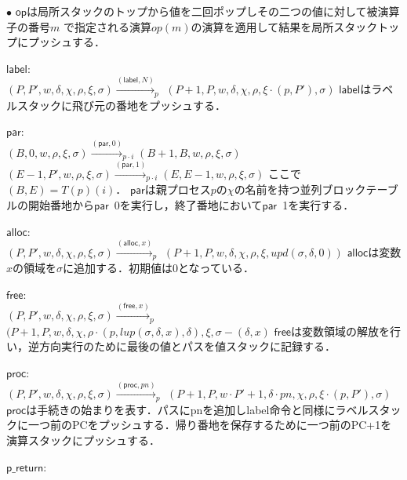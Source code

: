 \documentclass[submit,PRO]{ipsj}
\newcommand{\bcode}[1]{$\mathsf{#1}$}
\begin{document}
\begin{list}{$\bullet$}{}
\bcode{op}は局所スタックのトップから値を二回ポップしその二つの値に対して被演算子の番号$m$
で指定される演算$op(m)$の演算を適用して結果を局所スタックトップにプッシュする．
\item \bcode{label}:\\
$(P,P',w,\delta,\chi,\rho,\xi,\sigma)\xrightarrow{(\mathsf{label},N)}_p$\newline
\qquad$(P+1,P,w,\delta,\chi,\rho,\xi\cdot(p,P'),\sigma)$\newline
\bcode{label}はラベルスタックに飛び元の番地をプッシュする．
\item \bcode{par}:\\
$(B,0,w,\rho,\xi,\sigma)\xrightarrow{(\mathsf{par},0)}_{p\cdot i}(B+1,B,w,\rho,\xi,\sigma)$\newline
$(E-1,P',w,\rho,\xi,\sigma)\xrightarrow{(\mathsf{par},1)}_{p\cdot i}(E,E-1,w,\rho,\xi,\sigma)$\newline
ここで$(B,E)=T(p)(i)$．
\bcode{par}は親プロセス$p$の$\chi$の名前を持つ並列ブロックテーブルの開始番地から\bcode{par}\ 0を実行し，終了番地において\bcode{par}\ 1を実行する．
\item \bcode{alloc}:\\
$(P,P',w,\delta,\chi,\rho,\xi,\sigma)\xrightarrow{(\mathsf{alloc},x)}_p$\newline
\qquad $(P+1,P,w,\delta,\chi,\rho,\xi,upd(\sigma,\delta,0))$\newline
\bcode{alloc}は変数$x$の領域を$\sigma$に追加する．初期値は0となっている．
\item \bcode{free}:\\
$(P,P',w,\delta,\chi,\rho,\xi,\sigma)\xrightarrow{(\mathsf{free},x)}_p$\newline
\qquad $(P+1,P,w,\delta,\chi,\rho\cdot(p,lup(\sigma,\delta,x),\delta),\xi,\sigma-(\delta,x)$\newline
\bcode{free}は変数領域の解放を行い，逆方向実行のために最後の値とパスを値スタックに記録する．
\item \bcode{proc}:\\
$(P,P',w,\delta,\chi,\rho,\xi,\sigma)\xrightarrow{(\mathsf{proc},pn)}_p$\newline
\qquad $(P+1,P,w\cdot P'+1,\delta\cdot pn,\chi,\rho,\xi\cdot(p,P'),\sigma)$\newline
\bcode{proc}は手続きの始まりを表す．パスにpnを追加しlabel命令と同様にラベルスタックに一つ前のPCをプッシュする．帰り番地を保存するために一つ前のPC+1を演算スタックにプッシュする．
\item \bcode{p\_return}:\\

\end{list}
\end{document}
